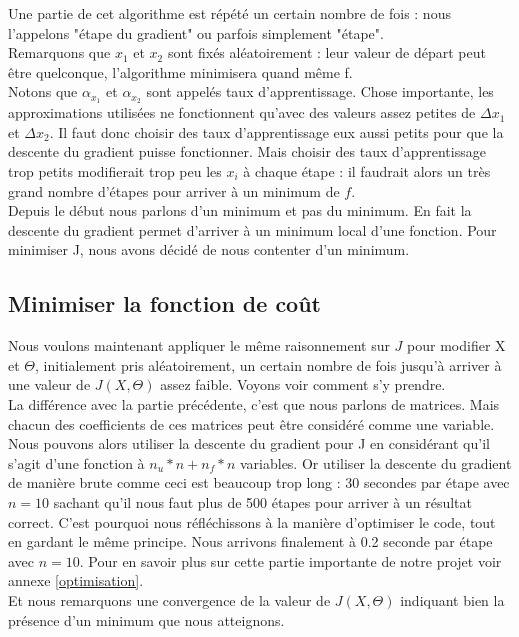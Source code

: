 \documentclass[a4paper,10pt]{article}
\begin{document}
\noindent Une partie de cet algorithme est répété un certain nombre de fois : nous l'appelons "étape du gradient" ou parfois simplement "étape".\\
Remarquons que $x_1$ et $x_2$ sont fixés aléatoirement : leur valeur de départ peut être quelconque, l'algorithme minimisera quand même f.\\
Notons que $\alpha_{x_1}$ et $\alpha_{x_2}$ sont appelés taux d'apprentissage.
Chose importante, les approximations utilisées ne fonctionnent qu'avec des valeurs assez petites de $\Delta x_1$ et $\Delta x_2$. Il faut donc choisir des taux d'apprentissage eux aussi petits pour que la descente du gradient puisse fonctionner. Mais choisir des taux d'apprentissage trop petits modifierait trop peu les $x_i$ à chaque étape : il faudrait alors un très grand nombre d'étapes pour arriver à un minimum de $f$.\\

Depuis le début nous parlons d'un minimum et pas du minimum. En fait la descente du gradient permet d'arriver à un minimum local d'une fonction. Pour minimiser J, nous avons décidé de nous contenter d'un minimum.

\subsection{Minimiser la fonction de coût}

Nous voulons maintenant appliquer le même raisonnement sur $J$ pour modifier X et $\Theta$, initialement pris aléatoirement, un certain nombre de fois jusqu'à arriver à une valeur de $J(X, \Theta)$ assez faible. Voyons voir comment s'y prendre.\\

La différence avec la partie précédente, c'est que nous parlons de matrices. Mais chacun des coefficients de ces matrices peut être considéré comme une variable. Nous pouvons alors utiliser la descente du gradient pour J en considérant qu'il s'agit d'une fonction à $n_u * n + n_f * n$ variables. Or utiliser la descente du gradient de manière brute comme ceci est beaucoup trop long : 30 secondes par étape avec $n = 10$ sachant qu'il nous faut plus de 500 étapes pour arriver à un résultat correct. C'est pourquoi nous réfléchissons à la manière d'optimiser le code, tout en gardant le même principe. Nous arrivons finalement à 0.2 seconde par étape avec $n = 10$. Pour en savoir plus sur cette partie importante de notre projet voir annexe \ref{optimisation}.\\
Et nous remarquons une convergence de la valeur de $J(X, \Theta)$ indiquant bien la présence d'un minimum que nous atteignons.
\end{document}
